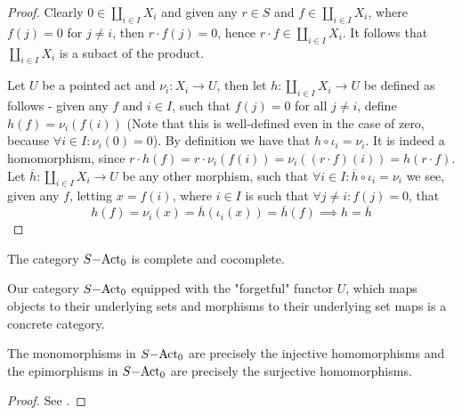 \begin{proof}
    Clearly $0\in\coprod_{i\in I } X_i$ and given any $r\in S$ and $f\in\coprod_{i\in I } X_i$, where 
    $f(j)=0$ for $j\neq i$, then $r\cdot f(j)=0$, hence $r\cdot f \in\coprod_{i\in I} X_i$. It follows that 
    $\coprod_{i\in I} X_i$ is a subact of the product.\par 
    Let $U$ be a pointed act and $\nu_i : X_i \to U$, then let $h: \coprod_{i\in I} X_i \to U$ be defined as follows - 
    given any $f$ and $i\in I$, such that $f(j)=0$ for all $j\neq i$, define $h(f) = \nu_i(f(i))$ (Note that this is well-defined 
    even in the case of zero, because $\forall i\in I : \nu_i(0) = 0$). By definition we have that $h\circ \iota_i = \nu_i$. It is 
    indeed a homomorphism, since $r\cdot h(f) = r\cdot\nu_i(f(i))=\nu_i((r\cdot f)(i)) = h(r\cdot f)$. Let 
    $\overline{h} : \coprod_{i\in I } X_i \to U$ be any other morphism, such that $\forall i\in I :\overline{h}\circ\iota_i = \nu_i$ we see, given 
    any $f$, letting $x=f(i)$, where $i\in I$ is such that $\forall j\neq i : f(j)=0$, that 
    \[
        h(f) = \nu_i(x) = \overline{h}(\iota_i(x)) = \overline{h}(f) \implies h=\overline{h} 
    \]
\end{proof}
\begin{corollary}
    The category $S\mathrm{-Act}_0$ is complete and cocomplete.
\end{corollary}
    Our category $S\mathrm{-Act}_0$ equipped with the "forgetful" functor $U$, which maps objects to their underlying sets and morphisms 
    to their underlying set maps is a concrete category.
\begin{proposition}
    The monomorphisms in $S\mathrm{-Act}_0$ are precisely the injective homomorphisms and the epimorphisms in $S\mathrm{-Act}_0$ are precisely
    the surjective homomorphisms.
\end{proposition}
\begin{proof}
    See \cite[Proposition~6.15]{Kilp00}.
\end{proof}

